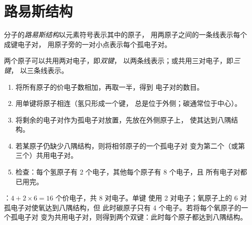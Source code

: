 \section{路易斯结构}

\begin{definition}[路易斯结构]\label{def:g10:lewis-and-shape:lewis-structure}
分子的\emph{路易斯结构}以元素符号表示其中的原子，
用两原子之间的一条线表示每个成键电子对，
用原子旁的一对小点表示每个孤电子对。
\end{definition}

\begin{definition}[双键与三键]\label{def:g10:lewis-and-shape:multiple-bond}
两个原子可以共用两对电子，即\emph{双键}，
以两条线表示；或共用三对电子，即\emph{三键}，
以三条线表示。
\end{definition}

\begin{method}[画路易斯结构]\label{met:g10:lewis-and-shape:draw}
\begin{enumerate}
  \item 将所有原子的价电子数相加，再取一半，得到
        电子对的数目。
  \item 用单键将原子相连（氢只形成一个键，
        总是位于外侧；碳通常位于中心）。
  \item 将剩余的电子对作为孤电子对放置，先放在外侧原子上，
        使其达到八隅结构。
  \item 若某原子仍缺少八隅结构，则将相邻原子的一个孤电子对
        变为第二个（或第三个）共用电子对。
  \item 检查：每个氢原子有 2 个电子，其他每个原子有 8 个电子，且
        所有电子对都已用完。
\end{enumerate}
\end{method}

\begin{example}[二氧化碳]\label{ex:g10:lewis-and-shape:co2}
：$4 + 2 \times 6 = 16$ 个价电子，共 8 对电子。单键
 使用 2 对电子；氧原子上的 6 对孤电子对使氧达到八隅结构，但
此时碳原子只有 4 个电子。若将每个氧原子的一个孤电子对
变为共用电子对，则得到两个双键：此时每个原子都达到八隅结构。
\end{example}

